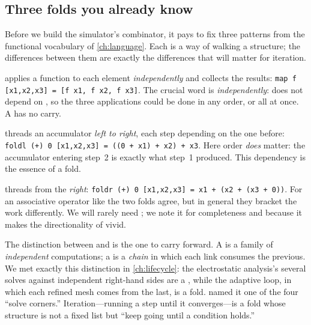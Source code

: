 \subsection{Three folds you already know}

Before we build the simulator's combinator, it pays to fix three patterns from
the functional vocabulary of \cref{ch:language}. Each is a way of walking a
structure; the differences between them are exactly the differences that will
matter for iteration.

\begin{description}[style=nextline, leftmargin=0pt, font=\normalfont\itshape]
  \item[\code{map}] applies a function to each element \emph{independently} and
  collects the results: \lstinline[style=l4style]|map f [x1,x2,x3] = [f x1, f x2, f x3]|.
  The crucial word is \emph{independently}:  does not depend on
  , so the three applications could be done in any order, or all at
  once. A  has no carry.
  \item[\code{foldl}] threads an accumulator \emph{left to right}, each step
  depending on the one before:
  \lstinline[style=l4style]|foldl (+) 0 [x1,x2,x3] = ((0 + x1) + x2) + x3|.
  Here order \emph{does} matter: the accumulator entering step~2 is exactly what
  step~1 produced. This dependency is the essence of a fold.
  \item[\code{foldr}] threads from the \emph{right}:
  \lstinline[style=l4style]|foldr (+) 0 [x1,x2,x3] = x1 + (x2 + (x3 + 0))|. For an
  associative operator like \code{+} the two folds agree, but in general they
  bracket the work differently. We will rarely need ; we note it for
  completeness and because it makes the directionality of  vivid.
\end{description}

The distinction between  and  is the one to carry forward.
A  is a family of \emph{independent} computations; a  is a
\emph{chain} in which each link consumes the previous. We met exactly this
distinction in \cref{ch:lifecycle}: the electrostatic analysis's several solves
against independent right-hand sides are a , while the adaptive loop,
in which each refined mesh comes from the last, is a fold. 
named it one of the four ``solve corners.'' Iteration---running a step until it
converges---is a fold whose structure is not a fixed list but ``keep going until
a condition holds.''

